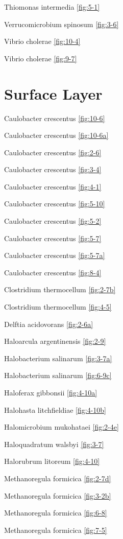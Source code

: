 \documentclass[]{tufte-book}
\begin{document}
Thiomonas intermedia \ref{fig:5-1}

Verrucomicrobium spinosum \ref{fig:3-6}

Vibrio cholerae \ref{fig:10-4}

Vibrio cholerae \ref{fig:9-7}

\hypertarget{surface-layer-1}{%
\section*{Surface Layer}\label{surface-layer-1}}

Caulobacter crescentus \ref{fig:10-6}

Caulobacter crescentus \ref{fig:10-6a}

Caulobacter crescentus \ref{fig:2-6}

Caulobacter crescentus \ref{fig:3-4}

Caulobacter crescentus \ref{fig:4-1}

Caulobacter crescentus \ref{fig:5-10}

Caulobacter crescentus \ref{fig:5-2}

Caulobacter crescentus \ref{fig:5-7}

Caulobacter crescentus \ref{fig:5-7a}

Caulobacter crescentus \ref{fig:8-4}

Clostridium thermocellum \ref{fig:2-7b}

Clostridium thermocellum \ref{fig:4-5}

Delftia acidovorans \ref{fig:2-6a}

Haloarcula argentinensis \ref{fig:2-9}

Halobacterium salinarum \ref{fig:3-7a}

Halobacterium salinarum \ref{fig:6-9c}

Haloferax gibbonsii \ref{fig:4-10a}

Halohasta litchfieldiae \ref{fig:4-10b}

Halomicrobium mukohataei \ref{fig:2-4e}

Haloquadratum walsbyi \ref{fig:3-7}

Halorubrum litoreum \ref{fig:4-10}

Methanoregula formicica \ref{fig:2-7d}

Methanoregula formicica \ref{fig:3-2b}

Methanoregula formicica \ref{fig:6-8}

Methanoregula formicica \ref{fig:7-5}
\end{document}
